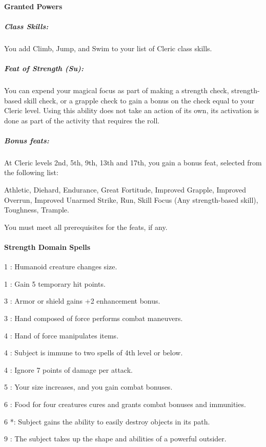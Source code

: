 \paragraph{Granted Powers}
\subparagraph{Class Skills:}
You add Climb, Jump, and Swim to your list of Cleric class skills.
\subparagraph{Feat of Strength (Su):}
You can expend your magical focus as part of making a strength check, strength-based skill check, or a grapple check to gain a bonus on the check equal to your Cleric level.
Using this ability does not take an action of its own, its activation is done as part of the activity that requires the roll.
\subparagraph{Bonus feats:}
At Cleric levels 2nd, 5th, 9th, 13th and 17th, you gain a bonus feat, selected from the following list:

Athletic, Diehard, Endurance, Great Fortitude, Improved Grapple, Improved Overrun, Improved Unarmed Strike, Run, Skill Focus (Any strength-based skill), Toughness, Trample.

You must meet all prerequisites for the feats, if any.
\paragraph{Strength Domain Spells}
\begin{list}{}{\leftmargin=1em}
\item[1] : Humanoid creature changes size.
\item[1] : Gain 5 temporary hit points.
\item[3] : Armor or shield gains +2 enhancement bonus.
\item[3] : Hand composed of force performs combat maneuvers.
\item[4] : Hand of force manipulates items.
\item[4] : Subject is immune to two spells of 4th level or below.
\item[4] : Ignore 7 points of damage per attack.
\item[5] : Your size increases, and you gain combat bonuses.
\item[6] : Food for four creatures cures and grants combat bonuses and immunities.
\item[6] *: Subject gains the ability to easily destroy objects in its path.
\item[9] : The subject takes up the shape and abilities of a powerful outsider.
\end{list}
